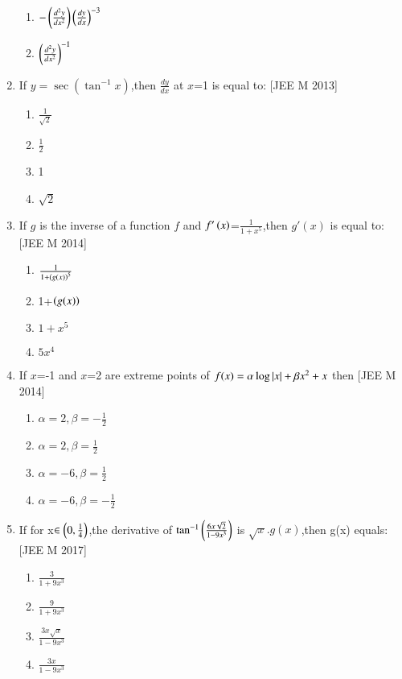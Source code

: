 \documentclass[journal,12pt,twocolumn]{IEEEtran}
\theoremstyle{remark}
\begin{document}
\begin{enumerate}
\begin{enumerate}
		    \item $-\left({\frac{d^2y}{dx^2}}\right)\left({\frac{dy}{dx}}\right)^{-3}$
		    \item $\left(\frac{d^2y}{dx^2}\right)^{-1}$\\
	    \end{enumerate}
    \item If $y=\sec(\tan^{-1}x)$,then $\frac{dy}{dx}$ at $x$=1 is equal to:
    \hfill[JEE M 2013]
\break
     \begin{enumerate}
     \item $\frac{1}{\sqrt{2}}$
     \item $\frac{1}{2}$
     \item 1
     \item $\sqrt{2}$\\
     \end{enumerate}
      \item If $g$ is the inverse of a function $f$ and $f'\left(x\right)$=$\frac{1}{1+x^5}$,then $g'(x)$ is equal to:
      \hfill[JEE M 2014]\break
      \begin{enumerate}
      \item $\frac{1}{1+\left({g(x)}\right)^5}$
      \item 1+$\left({g(x)}\right)$
      \item $1+x^5$
      \item $5x^4$\\
      \end{enumerate}
      \item If $x$=-1 and $x$=2 are extreme points of $f(x)=\alpha\log\left\vert x\right\vert+\beta x^2+x$ then 
	      \hfill[JEE M 2014]
	      \begin{enumerate}
		      \item $\alpha=2,\beta=-\frac{1}{2}$
		      \item $\alpha=2,\beta=\frac{1}{2}$
		      \item $\alpha=-6,\beta=\frac{1}{2}$
		      \item $\alpha=-6,\beta=-\frac{1}{2}$\\
	      \end{enumerate}
      \item If for x$\in\left(0,\frac{1}{4}\right)$,the derivative of $\tan^{-1}\left(\frac{6x\sqrt{2}}{1-9x^3}\right)$ is $\sqrt{x}.g(x)$,then g(x) equals:
	      \hfill[JEE M 2017]\break
	      \begin{enumerate}
		      \item $\frac{3}{1+9x^3}$
		      \item $\frac{9}{1+9x^3}$
		      \item $\frac{3x\sqrt{x}}{1-9x^3}$
		      \item $\frac{3x}{1-9x^3}$
	      \end{enumerate}
	      \end{enumerate}
	      
\end{document}
